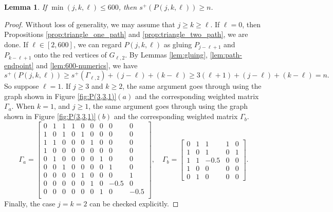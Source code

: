 \documentclass{article}
\newtheorem{lemma}{Lemma}[section]
\begin{document}
\begin{lemma}\label{lemma:less-than-600} 
If $\min(j, k, \ell) \leq 600$, then $s^+(P(j,k,\ell))\ge n$.
\end{lemma}

\begin{proof}
Without loss of generality, we may assume that $j \geq k \geq \ell$. If $\ell=0$, then Propositions \ref{prop:triangle_one_path} and \ref{prop:triangle_two_path}, we are done. If $\ell \in [2, 600]$, we can regard $P(j, k, \ell)$ as gluing $P_{j - \ell+1}$ and $P_{k - \ell+1}$ onto the red vertices of $G_{\ell, 2}$. By Lemmas \ref{lem:gluing}, \ref{lem:path-endpoint} and \ref{lem:600-numerics}, we have
\[s^+(P(j, k, \ell)) \geq s^+(\Gamma_{\ell, 2}) + (j - \ell) + (k - \ell)\ge 3(\ell +1) + (j-\ell) + (k-\ell) = n.\]
So suppose $\ell=1$. If $j \geq 3$ and $k \geq 2$, the same argument goes through using the graph shown in Figure \ref{fig:P(3,3,1)}$(a)$ and the corresponding weighted matrix $\Gamma_a$. When $k = 1$, and $j\ge 1$, the same argument goes through using the graph shown in Figure \ref{fig:P(3,3,1)}$(b)$ and the corresponding weighted matrix $\Gamma_b$. 
\[\Gamma_a  =   \begin{bmatrix}
    0 & 1 & 1 & 1 & 0 & 0 & 0 & 0 & 0\\
    1 & 0 & 1 & 0 & 1 & 0 & 0 & 0 & 0\\
    1 & 1 & 0 & 0 & 0 & 1 & 0 & 0 & 0\\
    1 & 0 & 0 & 0 & 0 & 0 & 0 & 0 & 0\\
    0 & 1 & 0 & 0 & 0 & 0 & 1 & 0 & 0\\
    0 & 0 & 1 & 0 & 0 & 0 & 0 & 1 & 0\\
    0 & 0 & 0 & 0 & 1 & 0 & 0 & 0 & 1\\
    0 & 0 & 0 & 0 & 0 & 1 & 0 & -0.5 & 0\\
    0 & 0 & 0 & 0 & 0 & 0 & 1 & 0 & -0.5\\
\end{bmatrix},  \quad \Gamma_b = \begin{bmatrix}
    0 & 1 & 1 & 1 & 0\\
    1 & 0 & 1 & 0 & 1\\
    1 & 1 & -0.5 & 0 & 0\\
    1 & 0 & 0 & 0 & 0 \\
    0 & 1 & 0 & 0 & 0
\end{bmatrix}.\]
Finally, the case $j = k = 2$ can be checked explicitly.
\end{proof}
\end{document}
